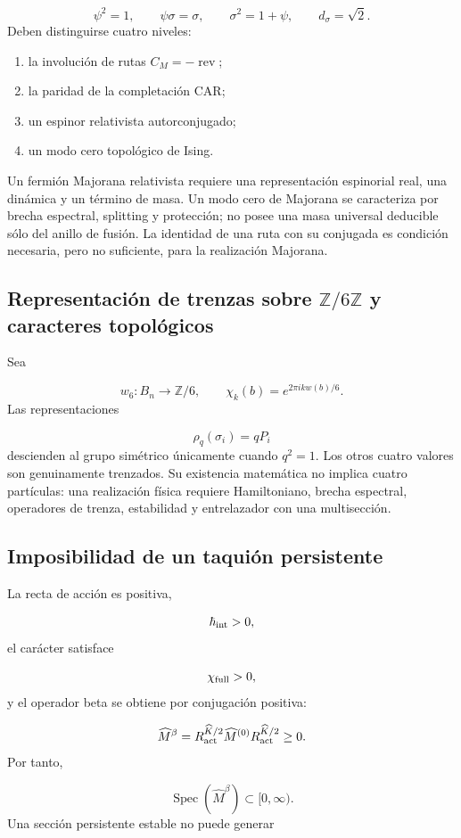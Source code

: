 \[
 \psi^2=1,\qquad
 \psi\sigma=\sigma,\qquad
 \sigma^2=1+\psi,\qquad
 d_\sigma=\sqrt2.
\]
Deben distinguirse cuatro niveles:

\begin{enumerate}
\item la involución de rutas \(C_M=-\operatorname{rev}\);
\item la paridad de la completación CAR;
\item un espinor relativista autorconjugado;
\item un modo cero topológico de Ising.
\end{enumerate}
Un fermión Majorana relativista requiere una representación espinorial real, una dinámica y un término de masa. Un modo cero de Majorana se caracteriza por brecha espectral, splitting y protección; no posee una masa universal deducible sólo del anillo de fusión. La identidad de una ruta con su conjugada es condición necesaria, pero no suficiente, para la realización Majorana.

\subsection{Representación de trenzas sobre \(\mathbb Z/6\mathbb Z\) y caracteres topológicos}
Sea

\[
 w_6:B_n\longrightarrow\mathbb Z/6,
\qquad
 \chi_k(b)=e^{2\pi ikw(b)/6}.
\]
Las representaciones

\[
 \rho_q(\sigma_i)=qP_i
\]
descienden al grupo simétrico únicamente cuando \(q^2=1\). Los otros cuatro valores son genuinamente trenzados. Su existencia matemática no implica cuatro partículas: una realización física requiere Hamiltoniano, brecha espectral, operadores de trenza, estabilidad y entrelazador con una multisección.

\subsection{Imposibilidad de un taquión persistente}
La recta de acción es positiva,

\[
 \hbar_{\rm int}>0,
\]
el carácter satisface

\[
 \chi_{\rm full}>0,
\]
y el operador beta se obtiene por conjugación positiva:

\[
 \widehat M^\beta
 =R_{\rm act}^{\widehat K/2}
 \widehat M^{(0)}
 R_{\rm act}^{\widehat K/2}\ge0.
\]
Por tanto,

\[
 \operatorname{Spec}(\widehat M^\beta)\subset[0,\infty).
\]
Una sección persistente estable no puede generar


